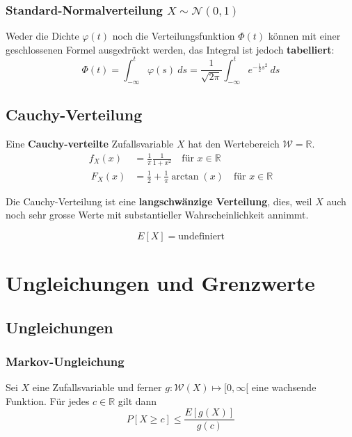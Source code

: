 \documentclass[11pt]{article}
\begin{document}
\subsubsection{Standard-Normalverteilung $X \sim \mathcal{N}(0, 1)$}

Weder die Dichte $\varphi(t)$ noch die Verteilungsfunktion $\Phi(t)$ k{\"o}nnen mit einer geschlossenen Formel ausgedr{\"u}ckt werden, das Integral ist jedoch \textbf{tabelliert}:
\begin{equation*}
	\Phi(t) = \int_{-\infty}^t \varphi(s)\ ds = \frac{1}{\sqrt{2\pi}}\int_{-\infty}^t e^{-\frac{1}{2}s^2}\ ds
\end{equation*}

\subsection{Cauchy-Verteilung}

Eine \textbf{Cauchy-verteilte} Zufallsvariable $X$ hat den Wertebereich $\mathcal{W} = \mathbb{R}$.
\begin{equation*}
\begin{split}
	f_X(x) & = \frac{1}{\pi}\frac{1}{1+x^2}\quad\text{f{\"u}r }x \in \mathbb{R} \\\
	F_X(x) & = \frac{1}{2}+\frac{1}{\pi}\arctan(x)\quad\text{f{\"u}r }x \in \mathbb{R}
\end{split}
\end{equation*}

Die Cauchy-Verteilung ist eine \textbf{langschw{\"a}nzige Verteilung}, dies, weil $X$ auch noch sehr grosse Werte mit substantieller Wahrscheinlichkeit annimmt.

\begin{equation*}
	E[X] = \text{undefiniert}
\end{equation*}

\section{Ungleichungen und Grenzwerte}

\subsection{Ungleichungen}

\subsubsection{Markov-Ungleichung}

Sei $X$ eine Zufallsvariable und ferner $g: \mathcal{W}(X) \mapsto [0, \infty[$ eine wachsende Funktion. F{\"u}r jedes $c \in \mathbb{R}$ gilt dann
\begin{equation*}
	P[X \geq c] \leq \frac{E[g(X)]}{g(c)}
\end{equation*}
\end{document}
